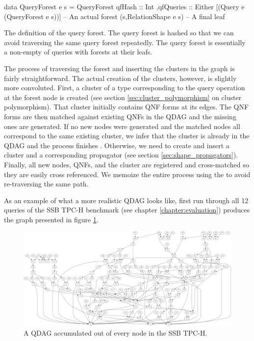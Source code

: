 \begin{code}
  \begin{haskellcode}
    data QueryForest e s =
      QueryForest
      { qfHash :: Int
        ,qfQueries
          :: Either
            [(Query e (QueryForest e s))] -- An actual forest
            (s,RelationShape e s) -- A final leaf
      }
  \end{haskellcode}

  \caption{\label{lst:query_forest}The definition of the query forest. The
    query forest is hashed so that we can avoid traversing the same
    query forest repeatedly. The query forest is essentially a
    non-empty of queries with forests at their leafs.}
\end{code}

The process of traversing the forest and inserting the clusters in the
graph is fairly straightforward. The actual creation of the clusters,
however, is slightly more convoluted. First, a cluster of a type
corresponding to the query operation at the forest node is created
(see section \ref{sec:cluster_polymorphism} on cluster
polymorphism). That cluster initially contains QNF forms at its
edges. The QNF forms are then matched against existing QNFs in the
QDAG and the missing ones are generated. If no new nodes were
generated and the matched nodes all correspond to the same existing
cluster, we infer that the cluster is already in the QDAG and the
process finishes . Otherwise, we need to create and insert a cluster
and a corresponding propagator (see section
\ref{sec:shape_propagators}). Finally, all new nodes, QNFs, and the
cluster are registered and cross-matched so they are easily cross
referenced.  We memoize the entire process using the  to
avoid re-traversing the same path.

As an example of what a more realistic QDAG looks like, first run
through all 12 queries of the SSB TPC-H benchmark (see chapter
\ref{chapter:evaluation}) produces the graph presented in figure
\ref{fig:ssb_graph}.

\begin{figure}[H]
  \centering
  \includegraphics[width=\textwidth]{./imgs/ssb_graph.pdf}
  \caption{\label{fig:ssb_graph}A QDAG accumulated out of every node
    in the SSB TPC-H.}
\end{figure}

